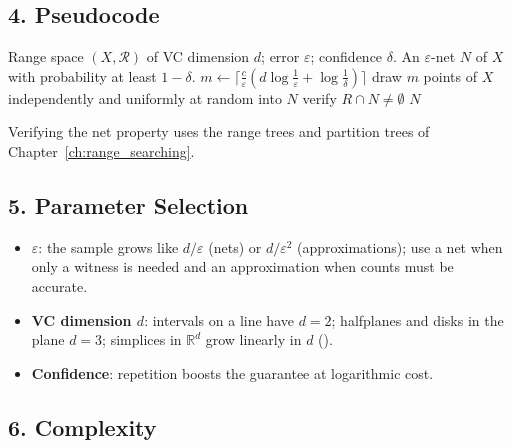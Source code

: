 \subsection{4. Pseudocode}

\begin{algorithm}[htbp]
\caption{Random Sampling for $\varepsilon$-Nets}
\label{alg:approx_eps_net_sample}
\begin{algorithmic}[1]
\Require Range space $(X, \mathcal{R})$ of VC dimension $d$; error $\varepsilon$; confidence $\delta$.
\Ensure An $\varepsilon$-net $N$ of $X$ with probability at least $1 - \delta$.
  \State $m \gets \lceil \frac{c}{\varepsilon}(d\log\frac{1}{\varepsilon} + \log\frac{1}{\delta})\rceil$
  \State draw $m$ points of $X$ independently and uniformly at random into $N$
    \State verify $R \cap N \neq \emptyset$ 
  \EndFor
    \State \Return {} 
  \EndIf
  \State \Return $N$
\EndFunction
\end{algorithmic}
\end{algorithm}

Verifying the net property uses the range trees and partition trees of
Chapter~\ref{ch:range_searching}.

\subsection{5. Parameter Selection}

\begin{itemize}
\item \textbf{$\varepsilon$}: the sample grows like $d/\varepsilon$ (nets)
  or $d/\varepsilon^2$ (approximations); use a net when only a witness is
  needed and an approximation when counts must be accurate.
\item \textbf{VC dimension $d$}: intervals on a line have $d = 2$;
  halfplanes and disks in the plane $d = 3$; simplices in $\mathbb{R}^d$
  grow linearly in $d$ (\cite{hausslerwelzl1987,matousek1999}).
\item \textbf{Confidence}: repetition boosts the guarantee at logarithmic
  cost.
\end{itemize}

\subsection{6. Complexity}


